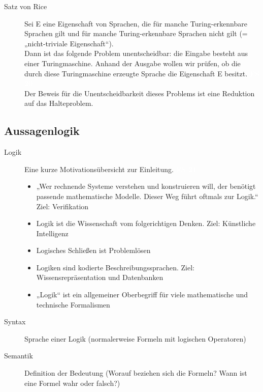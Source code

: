 \documentclass[a4paper,10pt]{article}
\newcommand{\vl}[1]{\colorbox{light-gray}{\textcolor{white}{\textbf{#1}}}}
\begin{document}
\begin{description}
        \item[Satz von Rice]
            Sei E eine Eigenschaft von Sprachen, die für manche Turing-erkennbare Sprachen gilt und für manche Turing-erkennbare Sprachen nicht gilt (= „nicht-triviale Eigenschaft“). \\ Dann ist das folgende Problem unentscheidbar: die Eingabe besteht aus einer Turingmaschine. Anhand der Ausgabe wollen wir prüfen, ob die durch diese Turingmaschine erzeugte Sprache die Eigenschaft E besitzt. \vl{FS 20} \\
            Der Beweis für die Unentscheidbarkeit dieses Problems ist eine Reduktion auf das Halteproblem.

    \end{description}

    \newpage
    \subsection{Aussagenlogik}
        \begin{description}
            \item[Logik] Eine kurze Motivationsübersicht zur Einleitung. \vl{FS 21}
                \begin{itemize}
                    \item „Wer rechnende Systeme verstehen und konstruieren will, der benötigt passende mathematische Modelle. Dieser Weg führt oftmals zur Logik.“ Ziel: Verifikation
                    \item Logik ist die Wissenschaft vom folgerichtigen Denken. Ziel: Künstliche Intelligenz
                    \item Logisches Schließen ist Problemlösen
                    \item Logiken sind kodierte Beschreibungssprachen. Ziel: Wissensrepräsentation und Datenbanken
                    \item „Logik“ ist ein allgemeiner Oberbegriff für viele mathematische und technische Formalismen
                \end{itemize}
            \item[Syntax] Sprache einer Logik (normalerweise Formeln mit logischen Operatoren)
            \item[Semantik] Definition der Bedeutung (Worauf beziehen sich die Formeln? Wann ist eine Formel wahr oder falsch?)
        \end{description}
\end{document}

